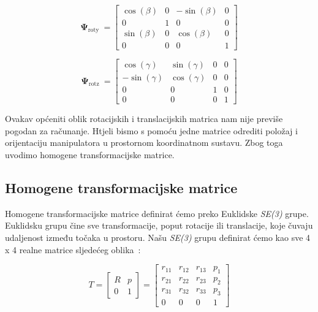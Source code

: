 \documentclass[times, utf8, diplomskirad]{fer}
\begin{document}
\begin{equation}
    \boldsymbol{\Psi}_{\text {roty }}=\left[\begin{array}{cccc}
        \cos (\beta) & 0 & -\sin (\beta) & 0 \\
        0 & 1 & 0 & 0 \\
        \sin (\beta) & 0 & \cos (\beta) & 0 \\
        0 & 0 & 0 & 1
    \end{array}\right]
    \label{eq:rotacija-y-matrica}
\end{equation}

\begin{equation}
    \boldsymbol{\Psi}_{\text {rotz }}=\left[\begin{array}{cccc}
    \cos (\gamma) & \sin (\gamma) & 0 & 0 \\
    -\sin (\gamma) & \cos (\gamma) & 0 & 0 \\
    0 & 0 & 1 & 0 \\
    0 & 0 & 0 & 1
    \end{array}\right]
    \label{eq:rotacija-z-matrica}
\end{equation}
\hfill

Ovakav općeniti oblik rotacijskih i translacijskih matrica nam nije previše pogodan za računanje.
Htjeli bismo s pomoću jedne matrice odrediti položaj i orijentaciju manipulatora u prostornom koordinatnom sustavu.
Zbog toga uvodimo homogene transformacijske matrice.
\newpage
\subsection{Homogene transformacijske matrice}
Homogene transformacijske matrice definirat ćemo preko Euklidske \textit{SE(3)} grupe.
Euklidsku grupu čine sve transformacije, poput rotacije ili translacije, koje čuvaju udaljenost između točaka u prostoru.
Našu \textit{SE(3)} grupu definirat ćemo kao sve 4 x 4 realne matrice sljedećeg oblika~\cite{10.5555/3165183}:

\begin{equation}
    T=\left[\begin{array}{cc}
    R & p \\
    0 & 1
    \end{array}\right]=\left[\begin{array}{cccc}
    r_{11} & r_{12} & r_{13} & p_1 \\
    r_{21} & r_{22} & r_{23} & p_2 \\
    r_{31} & r_{32} & r_{33} & p_3 \\
    0 & 0 & 0 & 1
    \end{array}\right]
    \label{eq:transformacijska matrica}
\end{equation}
\end{document}
